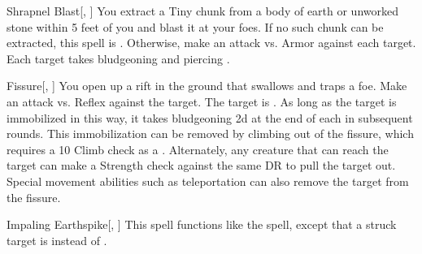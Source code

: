 \lowercase{\hypertarget{spell:Shrapnel Blast}{}}\label{spell:Shrapnel Blast}
\begin{freeability}[\nth{3}]{\hypertarget{spell:Shrapnel Blast}{Shrapnel Blast}}[, ]
You extract a Tiny chunk from a body of earth or unworked stone within 5 feet of you and blast it at your foes.
If no such chunk can be extracted, this spell is .
Otherwise, make an attack vs. Armor against each target.
\hit Each target takes bludgeoning and piercing .
\end{freeability}
\vspace{0.25em}



\lowercase{\hypertarget{spell:Fissure}{}}\label{spell:Fissure}
\begin{freeability}[\nth{4}]{\hypertarget{spell:Fissure}{Fissure}}[, ]
You open up a rift in the ground that swallows and traps a foe.
Make an attack vs. Reflex against the target.
\hit The target is .
As long as the target is immobilized in this way,
it takes bludgeoning  \minus2d at the end of each  in subsequent rounds.
This immobilization can be removed by climbing out of the fissure, which requires a  10 Climb check as a .
Alternately, any creature that can reach the target can make a Strength check against the same DR to pull the target out.
Special movement abilities such as teleportation can also remove the target from the fissure.
\end{freeability}
\vspace{0.25em}



\lowercase{\hypertarget{spell:Impaling Earthspike}{}}\label{spell:Impaling Earthspike}
\begin{freeability}[\nth{4}]{\hypertarget{spell:Impaling Earthspike}{Impaling Earthspike}}[, ]
This spell functions like the  spell, except that a struck target is  instead of .
\end{freeability}
\vspace{0.25em}



